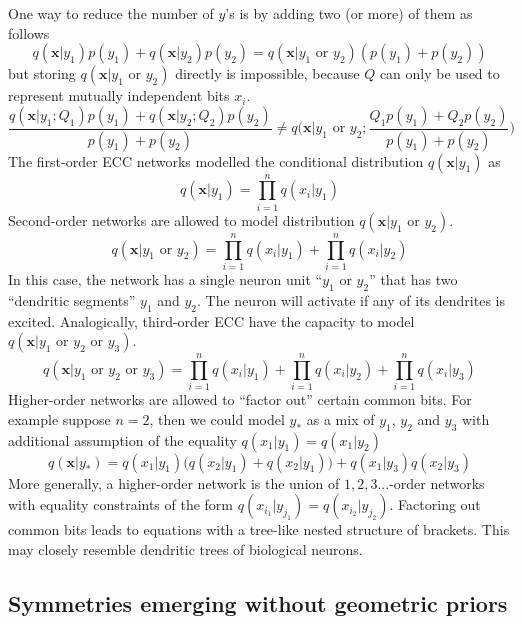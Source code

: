 \documentclass[12pt]{article}
\begin{document}
One way to reduce the number of $y$'s is by adding two (or more) of them as follows
\[
q(\boldsymbol{x}|y_1) p(y_1)+q(\boldsymbol{x}|y_2) p(y_2) = 
q(\boldsymbol{x}|y_1\text{ or }y_2) (p(y_1)+p(y_2))
\]
but storing $q(\boldsymbol{x}|y_1\text{ or }y_2)$ directly is impossible, because $Q$ can only be used to represent mutually independent bits $x_i$. 
\[
\frac{q(\boldsymbol{x}|y_1;Q_1) p(y_1)+q(\boldsymbol{x}|y_2;Q_2) p(y_2)}{p(y_1)+p(y_2)} \ne 
q\big(\boldsymbol{x}|y_1\text{ or }y_2;\frac{Q_1p(y_1) +Q_2p(y_2)}{p(y_1)+p(y_2)}\big) 
\]
The first-order ECC networks modelled the conditional distribution $q(\boldsymbol{x}|y_1)$ as
\[
q(\boldsymbol{x}|y_1) = \prod_{i=1}^{n}q(x_i|y_1)
\]
Second-order networks are allowed to model distribution $q(\boldsymbol{x}|y_1\text{ or }y_2)$. 
\[
q(\boldsymbol{x}|y_1\text{ or }y_2) = \prod_{i=1}^{n}q(x_i|y_1) + \prod_{i=1}^{n}q(x_i|y_2)
\]
In this case, the network has a single neuron unit ``$y_1\text{ or }y_2$'' that has two ``dendritic segments'' $y_1$ and $y_2$. The neuron will activate if any of its dendrites is excited. Analogically, third-order ECC have the capacity to model $q(\boldsymbol{x}|y_1\text{ or }y_2\text{ or }y_3)$. 
\[
q(\boldsymbol{x}|y_1\text{ or }y_2\text{ or }y_3) = \prod_{i=1}^{n}q(x_i|y_1) + \prod_{i=1}^{n}q(x_i|y_2) + \prod_{i=1}^{n}q(x_i|y_3)
\]
Higher-order networks are allowed to ``factor out'' certain common bits. For example suppose $n=2$, then we could model $y_*$ as a mix of $y_1$, $y_2$ and $y_3$ with additional assumption of the equality $q(x_1|y_1)=q(x_1|y_2)$
\[
q(\boldsymbol{x}|y_*) = q(x_1|y_1)\big(q(x_2|y_1) +q(x_2|y_1)\big) + q(x_1|y_3)q(x_2|y_3)
\]
More generally, a higher-order network is the union of $1,2,3...$-order networks with equality constraints of the form $q(x_{i_1}|y_{j_1})=q(x_{i_2}|y_{j_2})$. Factoring out common bits leads to equations with a tree-like nested structure of brackets.
This may closely resemble dendritic trees of biological neurons.

\subsection{Symmetries emerging without geometric priors}
\end{document}
